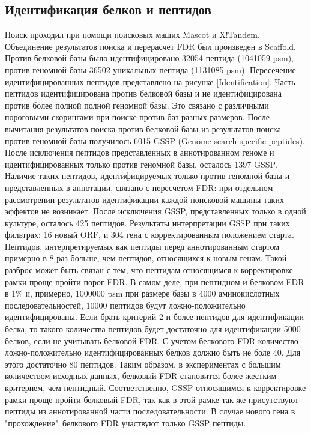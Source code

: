 \subsection{Идентификация белков и пептидов}
Поиск проходил при помощи поисковых маших Mascot и X!Tandem. Объединение результатов поиска и перерасчет FDR был произведен в Scaffold. Против белковой базы было идентифицировано 32054 пептида (1041059 psm), против геномной базы 36502 уникальных пептида (1131085 psm). Пересечение идентифицированных пептидов представлено на рисунке \ref{Identification}. Часть пептидов идентифицирована против белковой базы и не идентифицирована против более полной полной геномной базы. Это связано с различными пороговыми скорингами при поиске против баз разных размеров. 
После вычитания результатов поиска против белковой базы из результатов поиска против геномной базы получилось 6015 GSSP (Genome search specific peptides).  После исключения пептидов представленных в аннотированном геноме и идентифицированных только против геномной базы, осталось 1397 GSSP. Наличие таких пептидов, идентифицируемых только против геномной базы и представленных в аннотации, связано с пересчетом FDR: при отдельном рассмотрении результатов идентификации каждой поисковой машины таких эффектов не возникает.  После исключения GSSP, представленных только в одной культуре, осталось 425 пептидов. Результаты интерпретации GSSP при таких фильтрах: 16 новый ORF, и 304 гена с корректированным положением старта.  
Пептидов, интерпретируемых как пептиды перед аннотированным стартом примерно в 8 раз больше, чем пептидов, относящихся к новым генам. Такой разброс может быть связан с тем, что пептидам относящимся к корректировке рамки проще пройти порог FDR. В самом деле, при пептидном и белковом FDR в 1\% и, примерно, 1000000 psm при размере базы в 4000 аминокислотных последовательностей, 10000 пептидов будут ложно-положительно идентифицированы. Если брать критерий 2 и более пептидов для идентификации белка, то такого количества пептидов будет достаточно для идентификации 5000 белков, если не учитывать белковой FDR. С учетом белкового FDR количество ложно-положительно идентифицированных белков должно быть не боле 40. Для этого достаточно 80 пептидов. Таким образом, в экспериментах с большим количеством исходных данных, белковый FDR становится более жестким критерием, чем пептидный. Соответственно, GSSP относящимся к корректировке рамки проще пройти белковый FDR, так как в этой рамке так же присутствуют пептиды из аннотированной части последовательности. В случае нового гена в "прохождение"\ белкового FDR участвуют только GSSP пептиды.

